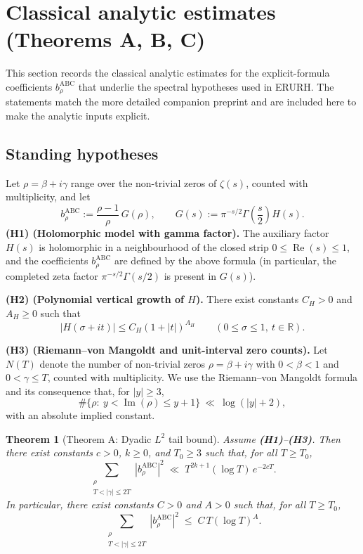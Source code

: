 \documentclass[11pt]{article}
\theoremstyle{plain}
\newtheorem{theorem}{Theorem}[section]
\theoremstyle{definition}
\newcommand{\Rea}{\operatorname{Re}}
\newcommand{\Imc}{\operatorname{Im}}
\newcommand{\R}{\mathbb{R}}
\newcommand{\brhoABC}{b_\rho^{\mathrm{ABC}}}
\begin{document}
\section{Classical analytic estimates (Theorems A, B, C)}
This section records the classical analytic estimates for the explicit-formula
coefficients $\brhoABC$ that underlie the spectral hypotheses used in ERURH. The
statements match the more detailed companion preprint and are included here to
make the analytic inputs explicit.

\subsection*{Standing hypotheses}
Let $\rho=\beta+i\gamma$ range over the non-trivial zeros of $\zeta(s)$,
counted with multiplicity, and let
\[
  \brhoABC := \frac{\rho-1}{\rho}\,G(\rho),
  \qquad
  G(s) := \pi^{-s/2}\Gamma\!\left(\frac{s}{2}\right)H(s).
\]
\noindent\textbf{(H1) (Holomorphic model with gamma factor).}
The auxiliary factor $H(s)$ is holomorphic in a neighbourhood of the closed
strip $0\le \Rea(s)\le 1$, and the coefficients $\brhoABC$ are defined by the above
formula (in particular, the completed zeta factor
$\pi^{-s/2}\Gamma(s/2)$ is present in $G(s)$).

\medskip
\noindent\textbf{(H2) (Polynomial vertical growth of $H$).}
There exist constants $C_H>0$ and $A_H\ge 0$ such that
\[
  |H(\sigma+it)| \le C_H(1+|t|)^{A_H}
  \qquad (0\le \sigma\le 1,\ t\in\R).
\]

\medskip
\noindent\textbf{(H3) (Riemann--von Mangoldt and unit-interval zero counts).}
Let $N(T)$ denote the number of non-trivial zeros
$\rho=\beta+i\gamma$ with $0<\beta<1$ and $0<\gamma\le T$, counted with
multiplicity. We use the Riemann--von Mangoldt formula and its consequence
that, for $|y|\ge 3$,
\[
  \#\{\rho:\ y<\Imc(\rho)\le y+1\}\ \ll\ \log(|y|+2),
\]
with an absolute implied constant.

\medskip
\begin{theorem}[Theorem A: Dyadic $L^2$ tail bound]\label{thm:A}
Assume \textbf{(H1)}--\textbf{(H3)}. Then there exist constants $c>0$, $k\ge 0$,
and $T_0\ge 3$ such that, for all $T\ge T_0$,
\[
  \sum_{\substack{\rho \\ T < |\gamma| \le 2T}} |\brhoABC|^2
  \;\ll\; T^{2k+1}(\log T)\,e^{-2cT}.
\]
In particular, there exist constants $C>0$ and $A>0$ such that, for all
$T\ge T_0$,
\[
  \sum_{\substack{\rho \\ T < |\gamma| \le 2T}} |\brhoABC|^2
  \;\le\; C\,T(\log T)^A.
\]
\end{theorem}
\end{document}
